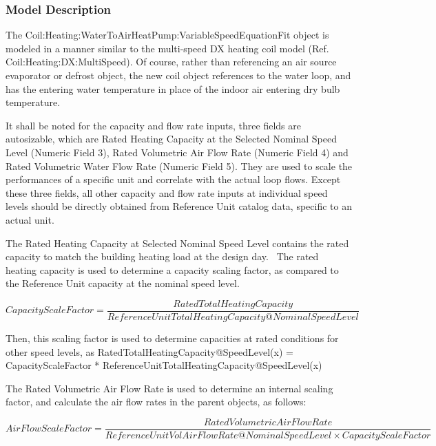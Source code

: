 \subsubsection{Model Description}\label{model-description-10}

The Coil:Heating:WaterToAirHeatPump:VariableSpeedEquationFit object is modeled in a manner similar to the multi-speed DX heating coil model (Ref. Coil:Heating:DX:MultiSpeed). Of course, rather than referencing an air source evaporator or defrost object, the new coil object references to the water loop, and has the entering water temperature in place of the indoor air entering dry bulb temperature.

It shall be noted for the capacity and flow rate inputs, three fields are autosizable, which are Rated Heating Capacity at the Selected Nominal Speed Level (Numeric Field 3), Rated Volumetric Air Flow Rate (Numeric Field 4) and Rated Volumetric Water Flow Rate (Numeric Field 5). They are used to scale the performances of a specific unit and correlate with the actual loop flows. Except these three fields, all other capacity and flow rate inputs at individual speed levels should be directly obtained from Reference Unit catalog data, specific to an actual unit.

The Rated Heating Capacity at Selected Nominal Speed Level contains the rated capacity to match the building heating load at the design day.~ The rated heating capacity is used to determine a capacity scaling factor, as compared to the Reference Unit capacity at the nominal speed level.

{\scriptsize
\begin{equation}
CapacityScaleFactor = \frac{{RatedTotalHeatingCapacity}}{{ReferenceUnitTotalHeatingCapacity@NominalSpeedLevel}}
\end{equation}}

Then, this scaling factor is used to determine capacities at rated conditions for other speed levels, as RatedTotalHeatingCapacity@SpeedLevel(x) = CapacityScaleFactor * ReferenceUnitTotalHeatingCapacity@SpeedLevel(x)

The Rated Volumetric Air Flow Rate is used to determine an internal scaling factor, and calculate the air flow rates in the parent objects, as follows:

{\scriptsize
\begin{equation}
AirFlowScaleFactor = \frac{{RatedVolumetricAirFlowRate}}{{ReferenceUnitVolAirFlowRate@NominalSpeedLevel \times CapacityScaleFactor}}
\end{equation}}

